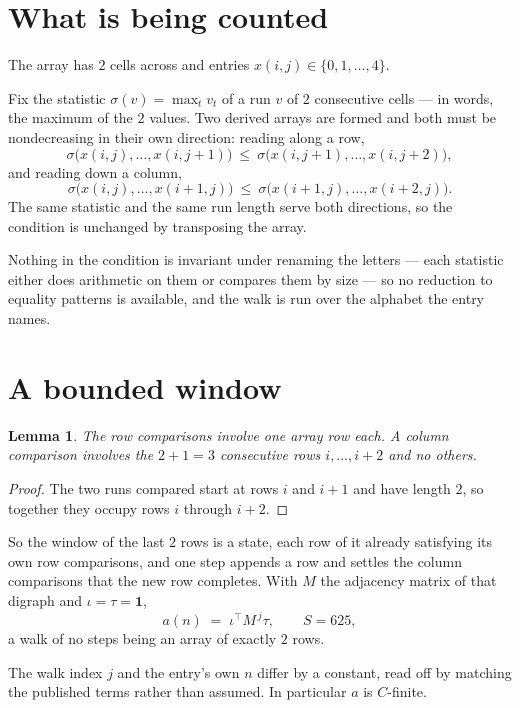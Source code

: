 \documentclass[11pt,a4paper]{article}
\theoremstyle{plain}
\newtheorem{lemma}[theorem]{Lemma}
\theoremstyle{definition}
\begin{document}
\section{What is being counted}

The array has $2$ cells across and entries $x(i,j)\in\{0,1,\dots,4\}$.

Fix the statistic $\sigma(v)=\max_t v_t$ of a run $v$ of $2$ consecutive cells --- in words,
the maximum of the $2$ values. Two derived arrays are formed and both must be
nondecreasing in their own direction: reading along a row,
\[
\sigma\bigl(x(i,j),\dots,x(i,j{+}1)\bigr)\ \le\
\sigma\bigl(x(i,j{+}1),\dots,x(i,j{+}2)\bigr),
\]
and reading down a column,
\[
\sigma\bigl(x(i,j),\dots,x(i{+}1,j)\bigr)\ \le\
\sigma\bigl(x(i{+}1,j),\dots,x(i{+}2,j)\bigr).
\]
The same statistic and the same run length serve both directions, so the condition is
unchanged by transposing the array.

Nothing in the condition is invariant under renaming the letters --- each statistic either does
arithmetic on them or compares them by size --- so no reduction to equality patterns is
available, and the walk is run over the alphabet the entry names.

\section{A bounded window}

\begin{lemma}\label{lem:win}
The row comparisons involve one array row each. A column comparison involves the
$2+1=3$ consecutive rows $i,\dots,i{+}2$ and no others.
\end{lemma}

\begin{proof}
The two runs compared start at rows $i$ and $i+1$ and have length $2$, so together they
occupy rows $i$ through $i+2$.
\end{proof}

So the window of the last $2$ rows is a state, each row of it already satisfying its own row
comparisons, and one step appends a row and settles the column comparisons that the new row
completes. With $M$ the adjacency matrix of that digraph and $\iota=\tau=\mathbf{1}$,
\[
a(n)\;=\;\iota^{\!\top}M^{\,j}\tau ,\qquad S=625,
\]
a walk of no steps being an array of exactly $2$ rows.

The walk index $j$ and the entry's own $n$ differ by a constant, read off by matching the
published terms rather than assumed. In particular $a$ is $C$-finite.
\end{document}
